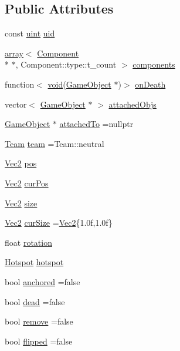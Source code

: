 \subsection*{Public Attributes}
\begin{DoxyCompactItemize}
\item 
const \hyperlink{common_8hpp_a69aa29b598b851b0640aa225a9e5d61d}{uint} \hyperlink{class_game_object_a8b00d8f156dd11c32aacf3d14d57b612}{uid}
\item 
\hyperlink{_s_d_l__opengl__glext_8h_a52f38e7d822a46377fde7a02708eedb1}{array}$<$ \hyperlink{class_component}{Component} \\*
$\ast$, Component\-::type\-::t\-\_\-count $>$ \hyperlink{class_game_object_acd9609420f9ee5681c594e9ac56aa435}{components}
\item 
function$<$ \hyperlink{_s_d_l__opengles2__gl2ext_8h_ae5d8fa23ad07c48bb609509eae494c95}{void}(\hyperlink{class_game_object}{Game\-Object} $\ast$)$>$ \hyperlink{class_game_object_a6956ff684f791c4f72e95083a1066127}{on\-Death}
\item 
vector$<$ \hyperlink{class_game_object}{Game\-Object} $\ast$ $>$ \hyperlink{class_game_object_aa530b362b47955806ed3301719d86bdd}{attached\-Objs}
\item 
\hyperlink{class_game_object}{Game\-Object} $\ast$ \hyperlink{class_game_object_ae7c5ba7343f3fe8639a4291c71947eaa}{attached\-To} =nullptr
\item 
\hyperlink{class_game_object_a74fa2cc06824179e7e66ec56c2e31aad}{Team} \hyperlink{class_game_object_a96c15a190af02288f73bb11051b5d2d7}{team} =Team\-::neutral
\item 
\hyperlink{class_vec2}{Vec2} \hyperlink{class_game_object_a6973314aaec56412f367c0b55e7459b9}{pos}
\item 
\hyperlink{class_vec2}{Vec2} \hyperlink{class_game_object_af1e7cdfc116c9219435d8222512af956}{cur\-Pos}
\item 
\hyperlink{class_vec2}{Vec2} \hyperlink{class_game_object_a28b3023a0c6dd731677123869d32885d}{size}
\item 
\hyperlink{class_vec2}{Vec2} \hyperlink{class_game_object_abe62d110f8637e110d8134283ed7b005}{cur\-Size} =\hyperlink{class_vec2}{Vec2}\{1.\-0f,1.\-0f\}
\item 
float \hyperlink{class_game_object_ac55f6ebdf4cfbab508680ad7290fb26c}{rotation}
\item 
\hyperlink{common_8hpp_aaa588ba8f99807e02a59c99df80af509}{Hotspot} \hyperlink{class_game_object_a42b24b440eaa2ef3c69e236b755f9ffc}{hotspot}
\item 
bool \hyperlink{class_game_object_a1fd27688e6d774763abdf05e817fe5a9}{anchored} =false
\item 
bool \hyperlink{class_game_object_a69b2c28686d4cce93cf49fa7a8a5cb88}{dead} =false
\item 
bool \hyperlink{class_game_object_ae939c981c524a76645abf33cd48b4214}{remove} =false
\item 
bool \hyperlink{class_game_object_a2434229e5fe5896e3fe2a06bd30b4189}{flipped} =false
\end{DoxyCompactItemize}
